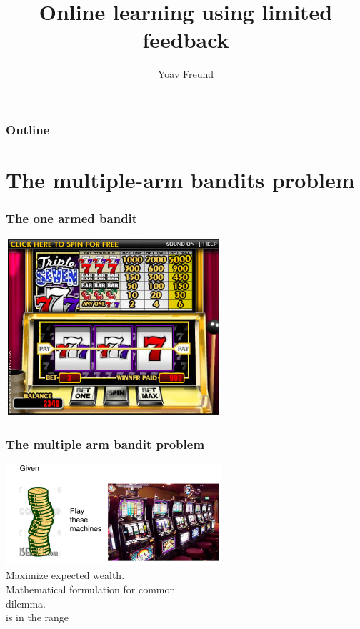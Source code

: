 \documentclass[handout]{beamer}
\title [Multi-arm Bandits] %
{Online learning using limited feedback}
\author[Freund] %
{Yoav Freund}
\institute[Universities of Somewhere and Elsewhere] %
\begin{document}
%

\begin{frame}
  \titlepage
\end{frame}

\begin{frame}
  \frametitle{Outline}
  \tableofcontents[pausesections]
\end{frame}

\section{The multiple-arm bandits problem}

\begin{frame}
\frametitle{The one armed bandit}
\includegraphics[width=8cm]{figures/OneArmBandit.jpg}
\end{frame}

\begin{frame}
\frametitle{The multiple arm bandit problem}
\includegraphics[width=8cm]{figures/multiArm.pdf}
\\
\pause
{} Maximize expected wealth.\\
\pause
Mathematical formulation for common \\
 dilemma.\\
\pause
{} is in the range \R{$[0,1]$}
\end{frame}
\end{document}
